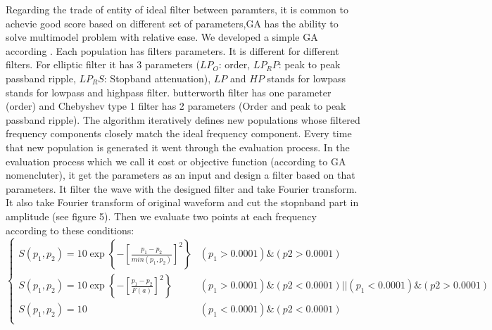 Regarding the trade of entity of ideal filter between paramters, it is common to achevie good score based on different set of parameters,GA has the ability to solve multimodel problem with relative ease. We developed a simple GA  according \citet{Man_1996}. Each population has filters parameters. It is different for different filters. For elliptic filter it has 3 parameters ($LP_O$: order, $LP_RP$: peak to peak passband ripple, $LP_RS$: Stopband attenuation), $LP$ and $HP$ stands for lowpass stands for lowpass and highpass filter. butterworth filter has one parameter (order) and Chebyshev type 1 filter has 2 parameters (Order and peak to peak passband ripple).   The algorithm iteratively defines new populations whose filtered frequency components closely match the ideal frequency component. Every time that new population is generated it went through the evaluation process. In the evaluation process which we call it cost or objective function (according to GA nomencluter), it get the parameters as an input and design a filter based on that parameters. It filter the wave with the designed filter and take Fourier transform. It also take Fourier transform of original waveform and cut the stopnband part in amplitude (see figure 5). Then we evaluate two points at each frequency according to these conditions:
% 
\begin{equation}
	\left\{
		\begin{matrix}
			S \left( p_1,p_2 \right) = 
				10 \exp \left\{ -\left[ \frac{p_1-p_2}{min \left(p_1,p_2\right)} \right]^2 \right\} 
				& (p_1 > 0.0001) \& (p2 > 0.0001) \\   

			S \left( p_1,p_2 \right) = 
				10 \exp \left\{ -\left[ \frac{p_1 - p_2}{F(a)} \right]^2 \right\}
				& (p_1 > 0.0001) \& (p2 < 0.0001) || (p_1 < 0.0001) \& (p2 > 0.0001)\\

			S \left( p_1,p_2 \right) = 
				10  
				& (p_1 < 0.0001) \& (p2 < 0.0001) \\
		\end{matrix}
	\right.
\end{equation}

